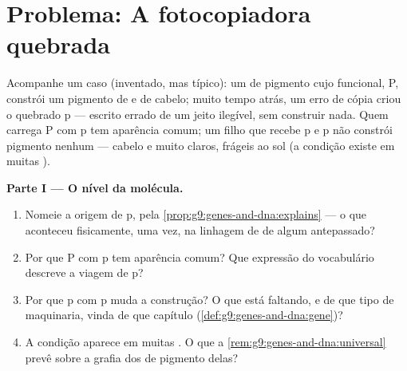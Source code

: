 \section{Problema: A fotocopiadora quebrada}

\begin{problem}\label{pb:g9:genes-and-dna:1}
Acompanhe um caso (inventado, mas típico): um  de
pigmento cujo  funcional, P, constrói um pigmento de
 e de cabelo; muito tempo atrás, um erro de cópia criou o
 quebrado p --- escrito errado de um jeito ilegível, sem
construir nada. Quem carrega P com p tem aparência comum; um
filho que recebe p e p não constrói pigmento nenhum ---
cabelo e  muito claros,  frágeis ao sol (a condição
existe em muitas ).

\medskip\noindent\textbf{Parte I --- O nível da molécula.}
\begin{enumerate}
  \item Nomeie a origem de p, pela
        \cref{prop:g9:genes-and-dna:explains} --- o que
        aconteceu fisicamente, uma vez, na linhagem de
         de algum antepassado?
  \item Por que P com p tem aparência comum? Que expressão
        do vocabulário descreve a viagem de p?
  \item Por que p com p muda a construção? O que está
        faltando, e de que tipo de maquinaria, vinda de que
        capítulo (\cref{def:g9:genes-and-dna:gene})?
  \item A condição aparece em muitas . O que a
        \cref{rem:g9:genes-and-dna:universal} prevê sobre a
        grafia dos  de pigmento delas?
\end{enumerate}


\end{problem}
